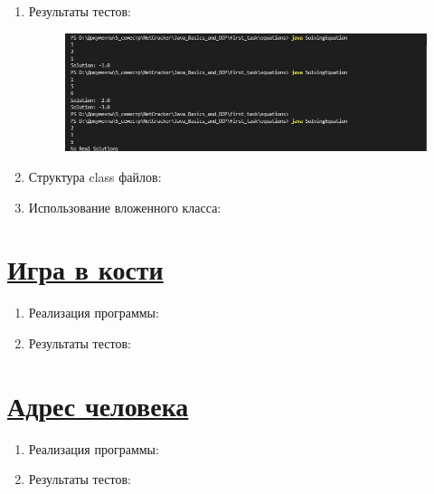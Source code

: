 \documentclass[a4paper]{article}
\begin{document}
\begin{enumerate}
\begin{lstlisting}
\end{lstlisting}

    \item Результаты тестов:
        
        \begin{figure}[h!]
            \begin{center}
                \includegraphics[scale = 0.6]{test_t1.png}
                \label{p2} %
            \end{center}
        \end{figure}
    
    \item Структура class файлов:
    
    \item Использование вложенного класса:
    
    

    
\end{enumerate}

\section{\href{https://github.com/julproh}{Игра в кости}} 

    \begin{enumerate}

        \item Реализация программы:
    
        \item Результаты тестов:
    
    \end{enumerate}

\section{\href{https://github.com/julproh}{Адрес человека}}

    \begin{enumerate}
   
        \item Реализация программы:
    
        \item Результаты тестов:
    
    \end{enumerate}
\end{document}

